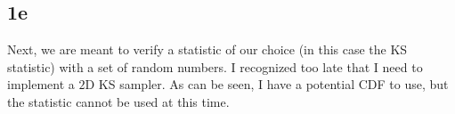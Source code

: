 \subsection{1e}


Next, we are meant to verify a statistic of our choice (in this case the 
KS statistic) with a set of random numbers. I recognized too late that I need
to implement a $2$D KS sampler. As can be seen, I have a potential CDF to use,
but the statistic cannot be used at this time.

